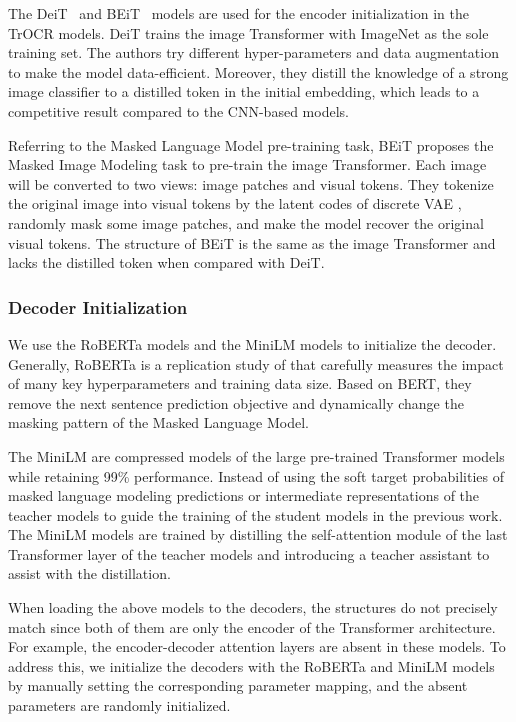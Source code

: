 \documentclass[letterpaper]{article} \usepackage{aaai23}  \usepackage{times}  \usepackage{helvet}  \usepackage{courier}  \usepackage[hyphens]{url}  \usepackage{graphicx} \urlstyle{rm} \def\UrlFont{\rm}  \usepackage{natbib}  \usepackage{caption} \frenchspacing  \setlength{\pdfpagewidth}{8.5in} \setlength{\pdfpageheight}{11in} \usepackage{algorithm}
\begin{document}
The DeiT~\cite{touvron2020deit} and BEiT~\cite{bao2021beit} models are used for the encoder initialization in the TrOCR models.
DeiT trains the image Transformer with ImageNet \cite{deng2009imagenet} as the sole training set. The authors try different hyper-parameters and data augmentation to make the model data-efficient. Moreover, they distill the knowledge of a strong image classifier to a distilled token in the initial embedding, which leads to a competitive result compared to the CNN-based models.

Referring to the Masked Language Model pre-training task, BEiT proposes the Masked Image Modeling task to pre-train the image Transformer. Each image will be converted to two views: image patches and visual tokens. They tokenize the original image into visual tokens by the latent codes of discrete VAE \cite{ramesh2021zero}, randomly mask some image patches, and make the model recover the original visual tokens. The structure of BEiT is the same as the image Transformer and lacks the distilled token when compared with DeiT.





\subsubsection{Decoder Initialization}

We use the RoBERTa \cite{liu2019roberta} models and the MiniLM \cite{wang2020minilm} models to initialize the decoder. Generally, RoBERTa is a replication study of \cite{devlin2019bert} that carefully measures the impact of many key hyperparameters and training data size. Based on BERT, they remove the next sentence prediction objective and dynamically change the masking pattern of the Masked Language Model. 

The MiniLM are compressed models of the large pre-trained Transformer models while retaining 99\% performance. Instead of using the soft target probabilities of masked language modeling predictions or intermediate representations of the teacher models to guide the training of the student models in the previous work. The MiniLM models are trained by distilling the self-attention module of the last Transformer layer of the teacher models and introducing a teacher assistant to assist with the distillation. 

When loading the above models to the decoders, the structures do not precisely match since both of them are only the encoder of the Transformer architecture. For example, the encoder-decoder attention layers are absent in these models.
To address this, we initialize the decoders with the RoBERTa and MiniLM models by manually setting the corresponding parameter mapping, and the absent parameters are randomly initialized.
\end{document}
